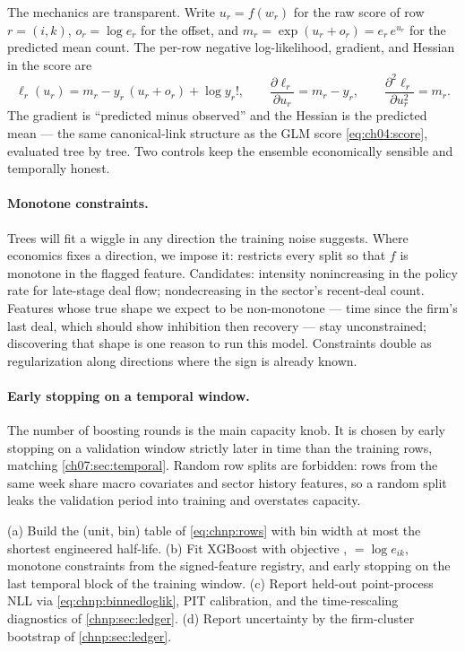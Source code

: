 The mechanics are transparent. Write $u_r = f(w_r)$ for the raw score of
row $r = (i,k)$, $o_r = \log e_r$ for the offset, and
$m_r = \exp(u_r + o_r) = e_r\, e^{u_r}$ for the predicted mean count.
The per-row negative log-likelihood, gradient, and Hessian in the score
are
\begin{equation}\label{eq:chnp:gradhess}
\ell_r(u_r) = m_r - y_r\,(u_r + o_r) + \log y_r! ,
\qquad
\frac{\partial \ell_r}{\partial u_r} = m_r - y_r ,
\qquad
\frac{\partial^2 \ell_r}{\partial u_r^2} = m_r .
\end{equation}
The gradient is ``predicted minus observed'' and the Hessian is the
predicted mean --- the same canonical-link structure as the GLM score
\cref{eq:ch04:score}, evaluated tree by tree. Two controls keep the
ensemble economically sensible and temporally honest.

\paragraph{Monotone constraints.}
Trees will fit a wiggle in any direction the training noise suggests.
Where economics fixes a direction, we impose it:
 restricts every split so that $f$ is
monotone in the flagged feature. Candidates: intensity nonincreasing in
the policy rate for late-stage deal flow; nondecreasing in the sector's
recent-deal count. Features whose true shape we expect to be
non-monotone --- time since the firm's last deal, which should show
inhibition then recovery --- stay unconstrained; discovering that shape
is one reason to run this model. Constraints double as regularization
along directions where the sign is already known.

\paragraph{Early stopping on a temporal window.}
The number of boosting rounds is the main capacity knob. It is chosen by
early stopping on a validation window strictly later in time than the
training rows, matching \cref{ch07:sec:temporal}. Random row splits are
forbidden: rows from the same week share macro covariates and sector
history features, so a random split leaks the validation period into
training and overstates capacity.

\begin{protocol}\label{prot:chnp:xgb}
(a) Build the (unit, bin) table of \cref{eq:chnp:rows} with bin width at
most the shortest engineered half-life. (b) Fit XGBoost with objective
,  $= \log e_{ik}$, monotone
constraints from the signed-feature registry, and early stopping on the
last temporal block of the training window. (c) Report held-out
point-process NLL via \cref{eq:chnp:binnedloglik}, PIT calibration, and
the time-rescaling diagnostics of \cref{chnp:sec:ledger}. (d) Report
uncertainty by the firm-cluster bootstrap of \cref{chnp:sec:ledger}.
\end{protocol}

